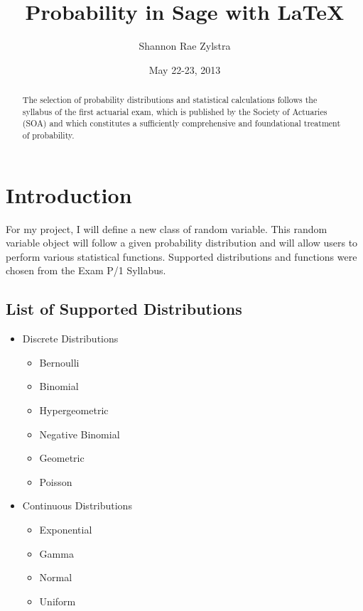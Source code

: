\documentclass{article}
\title{Probability in Sage with \LaTeX{}}
\author{Shannon Rae Zylstra}
\date{May 22-23, 2013}
\begin{document}
\maketitle %

\begin{abstract}
The selection of probability distributions and statistical calculations follows the syllabus of the
first actuarial exam, which is published by the Society of Actuaries (SOA) and which constitutes
a sufficiently comprehensive and foundational treatment of probability.
\end{abstract}

\newpage

\vfill
\tableofcontents
\clearpage

\section{Introduction}
For my project, I will define a new class of random variable.
This random variable object will follow a given probability distribution and will allow users to perform various statistical functions.
Supported distributions and functions were chosen from the Exam P/1 Syllabus. \\

\subsection{List of Supported Distributions}
\begin{itemize}
\item{Discrete Distributions}
    \begin{itemize}
     \item Bernoulli
     \item Binomial
     \item Hypergeometric
     \item Negative Binomial
     \item Geometric
     \item Poisson
    \end{itemize}
\item{Continuous Distributions}
    \begin{itemize}
     \item Exponential
     \item Gamma
     \item Normal
     \item Uniform
    \end{itemize}
\end{itemize}
\end{document}
